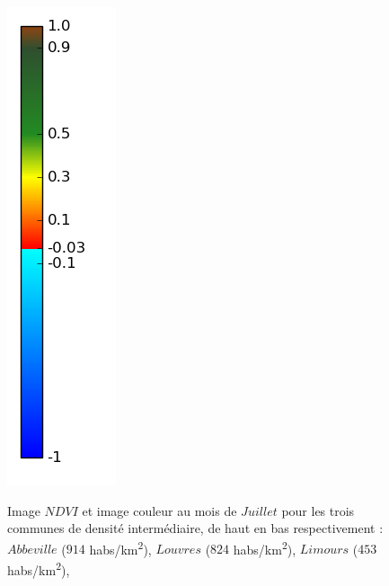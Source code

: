\documentclass{book}
\begin{document}
\begin{figure}[H]
{\includegraphics[scale=0.3]{images/colormap.png}
}
\caption{Image $NDVI$ et image couleur au mois de $Juillet$ pour les trois communes de densité intermédiaire, de haut en bas respectivement :
$Abbeville$ ($914$ habs/km\textsuperscript{2}),
$Louvres$ ($824$ habs/km\textsuperscript{2}),
$Limours$ ($453$ habs/km\textsuperscript{2}),
}
\label{ndvi_cat2}
\end{figure}
\clearpage
\end{document}
